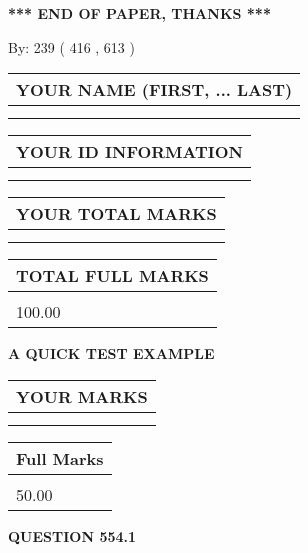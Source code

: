 \documentclass[12pt]{article}
\begin{document}
\vspace{1.0in} 
{\textbf{\large{ *** END OF PAPER, THANKS *** }}} 
   
   
\hspace{1.0in} By: 
 239 ( 416 ,  613 )
   
   
   
   
\newpage 
\setcounter{page}{ 
   554001 } 
   
   
   
   
\noindent\begin{tabular}{|l|}
\hline
YOUR NAME (FIRST, ... LAST)  \\
\hline
 \\ 
 \\ 
\hline
\end{tabular}
\hspace{0.05in} \begin{tabular}{|l|}
\hline
 YOUR   ID   INFORMATION  \\
\hline
 \\ 
 \\ 
\hline
\end{tabular}
   
   
\vspace{0.2in}\noindent\begin{tabular}{|l|}
\hline
YOUR TOTAL MARKS  \\
\hline
 \\ 
 \\ 
\hline
\end{tabular}
\hspace{0.05in} \begin{tabular}{|l|}
\hline
TOTAL FULL MARKS  \\
\hline
 \\ 
100.00 \\
\hline
\end{tabular}
   
   
 \vspace{0.2in}
{\LARGE {\textbf{ A QUICK TEST EXAMPLE}}}
   
   
  
\vspace{0.2in}
  
\noindent\begin{tabular}{|l|}
\hline
 YOUR MARKS  \\
\hline
 \\ 
 \\ 
\hline
\end{tabular}
\hspace{0.05in} \begin{tabular}{|l|}
\hline
 Full Marks  \\
\hline
 \\ 
50.00 \\
\hline
\end{tabular}
{\textbf{\Large{QUESTION
554.1 
}}}
  
\end{document}
